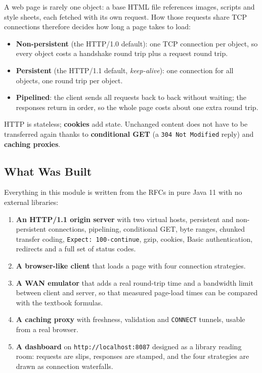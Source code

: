 \documentclass[11pt,a4paper]{article}
\begin{document}
A web page is rarely one object: a base HTML file references images, scripts and style sheets, each fetched with its own request. How those requests share TCP connections therefore decides how long a page takes to load:
\begin{itemize}[leftmargin=2em]
    \item \textbf{Non-persistent} (the HTTP/1.0 default): one TCP connection per object, so every object costs a handshake round trip plus a request round trip.
    \item \textbf{Persistent} (the HTTP/1.1 default, \emph{keep-alive}): one connection for all objects, one round trip per object.
    \item \textbf{Pipelined}: the client sends all requests back to back without waiting; the responses return in order, so the whole page costs about one extra round trip.
\end{itemize}
HTTP is stateless; \textbf{cookies} add state. Unchanged content does not have to be transferred again thanks to \textbf{conditional GET} (a \texttt{304 Not Modified} reply) and \textbf{caching proxies}.

\subsection{What Was Built}
Everything in this module is written from the RFCs in pure Java 11 with no external libraries:
\begin{enumerate}[leftmargin=2em]
    \item \textbf{An HTTP/1.1 origin server} with two virtual hosts, persistent and non-persistent connections, pipelining, conditional GET, byte ranges, chunked transfer coding, \texttt{Expect: 100-continue}, gzip, cookies, Basic authentication, redirects and a full set of status codes.
    \item \textbf{A browser-like client} that loads a page with four connection strategies.
    \item \textbf{A WAN emulator} that adds a real round-trip time and a bandwidth limit between client and server, so that measured page-load times can be compared with the textbook formulas.
    \item \textbf{A caching proxy} with freshness, validation and \texttt{CONNECT} tunnels, usable from a real browser.
    \item \textbf{A dashboard} on \texttt{http://localhost:8087} designed as a library reading room: requests are slips, responses are stamped, and the four strategies are drawn as connection waterfalls.
\end{enumerate}
\end{document}
